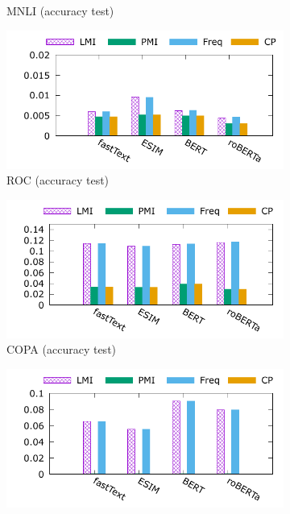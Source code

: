 \begin{figure}[th]
\begin{subfigure}[b]{0.24\textwidth}
\caption{MNLI (accuracy test)}
\label{fig:cue_mnli}
\end{subfigure}
\hfill
\begin{subfigure}[b]{0.24\textwidth}
\centering
\includegraphics[width=\columnwidth]{data/acc_roc.pdf}
\caption{ROC (accuracy test)}
\label{fig:cue_mnli}
\end{subfigure}
\hfill
\newpage
\begin{subfigure}[b]{0.24\textwidth}
\centering
\includegraphics[width=\columnwidth]{data/acc_copa.pdf}
\caption{COPA (accuracy test)}
\label{fig:cue_copa}
\end{subfigure}
\hfill
\begin{subfigure}[b]{0.24\textwidth}
\centering
\includegraphics[width=\columnwidth]{data/acc_reclor.pdf}

\end{subfigure}
\end{figure}
